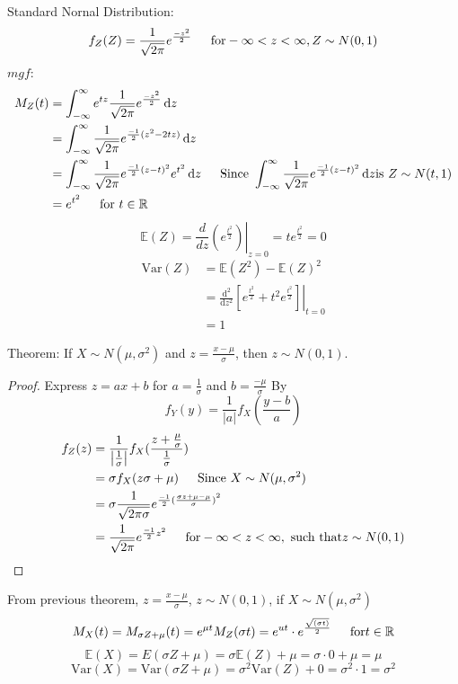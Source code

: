 \documentclass{article}
\newcommand{\abs}[1]{\left| #1 \right|}
\newcommand{\R}{\mathbb{R}}
\newcommand{\E}{\mathbb{E}}
\newcommand{\mgf}[2]{M_{#1}(#2)}
\newcommand{\Var}{\mathrm{Var}}
\newcommand{\sqr}[1]{{#1}^2}
\newcommand{\nder}[3]{\frac{\mathrm{d}^{#1} #2}{\mathrm{d} #3^{#1}}}
\newcommand{\uint}[4]{\int_{#1}^{#2} #3 \dd #4}
\newcommand{\dd}{\mathop{}\!\mathrm{d}}
\newcommand{\evalat}[2]{\left. #1 \right|_{#2}}
\begin{document}
Standard Nornal Distribution:
$$f_Z(Z) = \frac{1}{\sqrt{2\pi}}e^{\frac{-\sqr{z}}{2}} \indent \text{for} -\infty < z <\infty, Z \sim N(0, 1)$$
$mgf$:
\begin{align*}
    \mgf{Z}{t} &= \uint{-\infty}{\infty}{e^{tz}\frac{1}{\sqrt{2\pi}}e^{\frac{-\sqr{z}}{2}}}{z} \\
    &= \uint{-\infty}{\infty}{\frac{1}{\sqrt{2\pi}}e^{\frac{-1}{2}(z^2 - 2tz)}}{z} \\
    &= \uint{-\infty}{\infty}{\frac{1}{\sqrt{2\pi}}e^{\frac{-1}{2}\sqr{(z - t)}} e^{t^2}}{z} \indent \text{Since } \uint{-\infty}{\infty}{\frac{1}{\sqrt{2\pi}}e^{\frac{-1}{2}\sqr{(z-t)}}}{z} \text{is } Z \sim N(t, 1)\\
    &= e^{\sqr{t}} \indent \text{for } t \in \R
\end{align*}
$$\E(Z) = \evalat{\frac{d}{dz}(e^{\frac{\sqr{t}}{2}})}{z=0} = te^{\frac{\sqr{t}}{2}} = 0$$
\begin{align*}
    \Var(Z) &= \E(\sqr{Z}) - \sqr{\E(Z)} \\
    &= \evalat{\nder{2}{}{z}\left[e^{\frac{\sqr{t}}{2}} + \sqr{t}e^{\frac{\sqr{t}}{2}}\right]}{t=0}\\
    &= 1
\end{align*}

Theorem: If $X\sim N(\mu, \sqr{\sigma})$ and $z = \frac{x - \mu}{\sigma}$, then $z \sim N(0,1)$.
\begin{proof}
Express $z = ax + b$ for $a = \frac{1}{\sigma}$ and $b = \frac{-\mu}{\sigma}$
By $$f_Y(y) = \frac{1}{\abs{a}}f_X(\frac{y-b}{a})$$
\begin{align*}
    f_Z(z) &= \frac{1}{\abs{\frac{1}{\sigma}}}f_X(\frac{z + \frac{\mu}{\sigma}}{\frac{1}{\sigma}}) \\
    &= \sigma f_X(z\sigma + \mu) \indent \text{Since } X \sim N(\mu, \sqr{\sigma})\\
    &= \sigma \frac{1}{\sqrt{2\pi \sigma}}e^{\frac{-1}{2} \sqr{(\frac{\sigma z + \mu - \mu}{\sigma})}} \\
    &= \frac{1}{\sqrt{2\pi}} e^{\frac{-1}{2}\sqr{z}} \indent \text{for} -\infty < z < \infty, \text{ such that} z \sim N(0, 1)
\end{align*}
\end{proof}
From previous theorem, $z= \frac{x - \mu}{\sigma}$, $z \sim N(0,1)$, if $X \sim N(\mu, \sqr{\sigma})$
$$\mgf{X}{t} = \mgf{\sigma Z + \mu}{t} = e^{\mu t}\mgf{Z}{\sigma t} = e^{ut} \cdot e^{\frac{\sqrt{(\sigma t)}}{2}} \indent \text{for} t \in \R$$
$$\E(X) = E(\sigma Z + \mu) = \sigma \E(Z) + \mu = \sigma \cdot 0 + \mu = \mu$$
$$\Var(X) = \Var(\sigma Z + \mu) = \sqr{\sigma}\Var(Z) + 0 = \sqr{\sigma} \cdot 1 = \sqr{\sigma}$$
\end{document}
